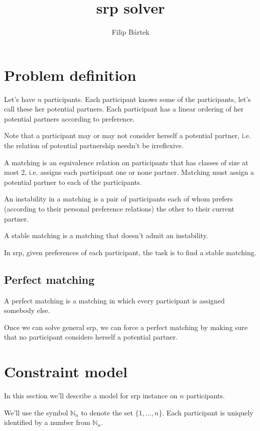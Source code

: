 \documentclass{article}
\newcommand{\nn}{\mathbb{N}_n}
\newcommand{\srp}{\acrshort{srp}}
\begin{document}
\title{\Acrlong{srp} solver}
\author{Filip Bártek}
\maketitle

\section{Problem definition}

Let's have $n$ participants.
Each participant knows some of the participants,
let's call these her potential partners.
Each participant has a linear ordering of her potential partners according
to preference.

Note that a participant may or may not consider herself a potential partner,
i.e. the relation of potential partnership needn't be irreflexive.

A matching is an equivalence relation on participants that has classes of size
at most 2,
i.e. assigns each participant one or none partner.
Matching must assign a potential partner to each of the participants.

An instability in a matching is a pair of participants each of whom prefers (according to their personal preference relations) the other to their current partner.

A stable matching is a matching that doesn't admit an instability.

In \acrfull{srp}, given preferences of each participant,
the task is to find a stable matching.

\subsection{Perfect matching}
A perfect matching is a matching in which every participant is assigned somebody else.

Once we can solve general \srp{},
we can force a perfect matching by making sure that no participant considers herself
a potential partner.

\section{Constraint model}
In this section we'll describe a model for \srp{} instance on $n$ participants.

We'll use the symbol $\nn$ to denote the set $\{1, \ldots, n\}$.
Each participant is uniquely identified by a number from $\nn$.
\end{document}
